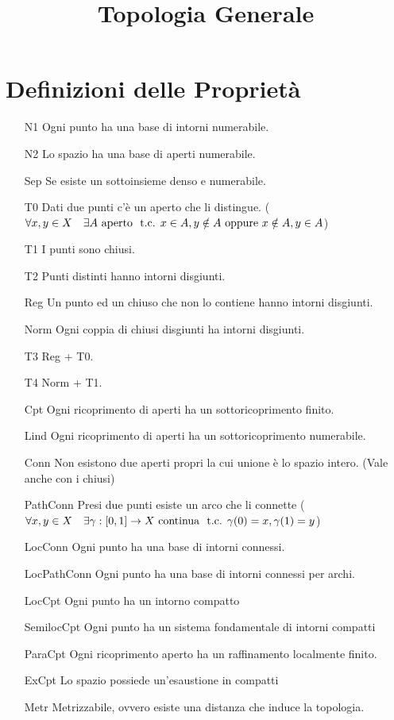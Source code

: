 \documentclass[a4paper,NoNotes,GeneralMath]{stdmdoc}
\newcommand{\aperto}{\text{ aperto }}
\newcommand{\continua}{\text{ continua }}
\begin{document}
	\title{Topologia Generale}
	
	\section*{Definizioni delle Proprietà}
	\begin{itemize}
		\item[N1] Ogni punto ha una base di intorni numerabile.
		\item[N2] Lo spazio ha una base di aperti numerabile.
		\item[Sep] Se esiste un sottoinsieme denso e numerabile.
		\item[T0] Dati due punti c'è un aperto che li distingue. ($\forall x, y \in X \quad \exists A \aperto \tc x \in A, y \notin A \opp x \notin A, y \in A$)
		\item[T1] I punti sono chiusi.
		\item[T2] Punti distinti hanno intorni disgiunti.
		\item[Reg] Un punto ed un chiuso che non lo contiene hanno intorni disgiunti.
		\item[Norm] Ogni coppia di chiusi disgiunti ha intorni disgiunti.
		\item[T3] Reg + T0.
		\item[T4] Norm + T1.
		\item[Cpt] Ogni ricoprimento di aperti ha un sottoricoprimento finito.
		\item[Lind] Ogni ricoprimento di aperti ha un sottoricoprimento numerabile.
		\item[Conn] Non esistono due aperti propri la cui unione è lo spazio intero. (Vale anche con i chiusi)
		\item[PathConn] Presi due punti esiste un arco che li connette ($\forall x, y \in X \quad \exists \gamma: [0,1] \rar X \continua \tc \gamma(0) = x, \gamma(1) = y$)
		\item[LocConn] Ogni punto ha una base di intorni connessi.
		\item[LocPathConn] Ogni punto ha una base di intorni connessi per archi.
		\item[LocCpt] Ogni punto ha un intorno compatto
		\item[SemilocCpt] Ogni punto ha un sistema fondamentale di intorni compatti
		\item[ParaCpt] Ogni ricoprimento aperto ha un raffinamento localmente finito.
		\item[ExCpt] Lo spazio possiede un'esaustione in compatti
		\item[Metr] Metrizzabile, ovvero esiste una distanza che induce la topologia.
	\end{itemize} \vskip 0.5cm
\end{document}

